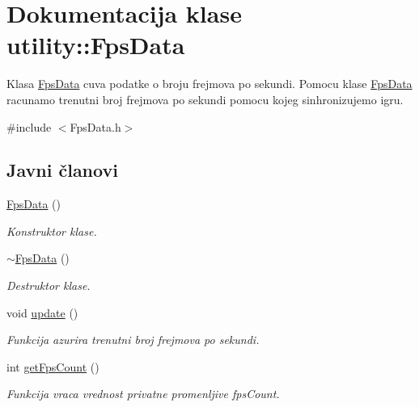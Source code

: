 \hypertarget{classutility_1_1FpsData}{}\section{Dokumentacija klase utility\+:\+:Fps\+Data}
\label{classutility_1_1FpsData}


Klasa \hyperlink{classutility_1_1FpsData}{Fps\+Data} cuva podatke o broju frejmova po sekundi. Pomocu klase \hyperlink{classutility_1_1FpsData}{Fps\+Data} racunamo trenutni broj frejmova po sekundi pomocu kojeg sinhronizujemo igru.  




{\ttfamily \#include $<$Fps\+Data.\+h$>$}

\subsection*{Javni članovi}
\begin{DoxyCompactItemize}
\item 
\hyperlink{classutility_1_1FpsData_a74340a4b4ca45996749c4393fdf6d9b2}{Fps\+Data} ()
\begin{DoxyCompactList}\small\item\em Konstruktor klase. \end{DoxyCompactList}\item 
\hyperlink{classutility_1_1FpsData_a99d760610ab41e30cf0d1150f60b9332}{$\sim$\+Fps\+Data} ()
\begin{DoxyCompactList}\small\item\em Destruktor klase. \end{DoxyCompactList}\item 
void \hyperlink{classutility_1_1FpsData_adcc115a219b00aa4d0c979955b617f91}{update} ()
\begin{DoxyCompactList}\small\item\em Funkcija azurira trenutni broj frejmova po sekundi. \end{DoxyCompactList}\item 
int \hyperlink{classutility_1_1FpsData_abd745ff03d01035ff7a5453558469c2c}{get\+Fps\+Count} ()
\begin{DoxyCompactList}\small\item\em Funkcija vraca vrednost privatne promenljive fps\+Count. \end{DoxyCompactList}\end{DoxyCompactItemize}
